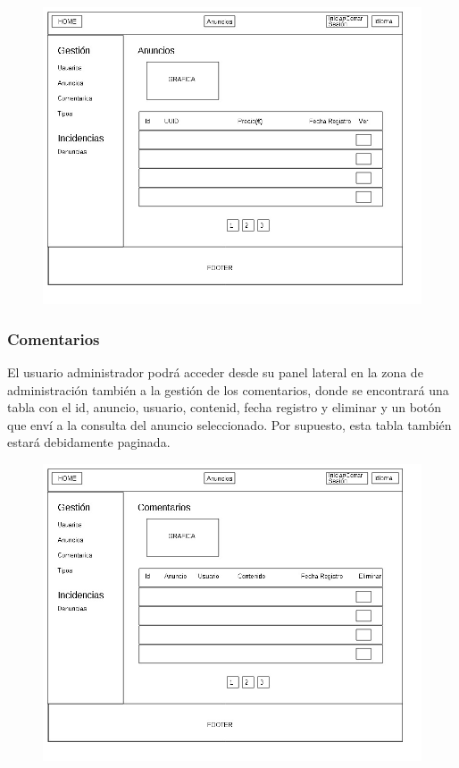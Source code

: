 \begin{figure}[h!]
\centering
\includegraphics[width=1\textwidth]{Img/VisionAplicacion/vision_9.jpg}
\end{figure}

\subsubsection{Comentarios}
El usuario administrador podr\'{a} acceder desde su panel lateral en la zona de administraci\'{o}n tambi\'{e}n a la gesti\'{o}n de los comentarios, donde se encontrar\'{a} una tabla con el id, anuncio, usuario, contenid, fecha registro y eliminar y un bot\'{o}n que env\'{i} a la consulta del anuncio seleccionado. Por supuesto, esta tabla tambi\'{e}n estar\'{a} debidamente paginada.

\begin{figure}[h!]
\centering
\includegraphics[width=1\textwidth]{Img/VisionAplicacion/vision_11.jpg}
\end{figure}

